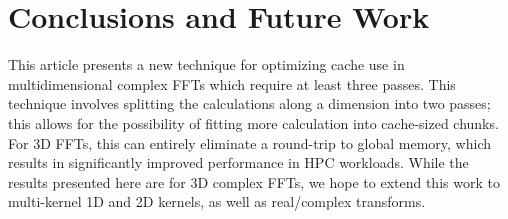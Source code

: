 \documentclass[11pt, onecolumn, journal,compsoc]{IEEEtran}
\theoremstyle{problemstyle}
\begin{document}


\section{Conclusions and Future Work}

This article presents a new technique for optimizing cache use in multidimensional complex FFTs which require at least three passes.  This
technique involves splitting the calculations along a dimension into two passes;
this allows for the possibility of fitting more calculation into
cache-sized chunks.  For 3D FFTs, this can entirely eliminate a
round-trip to global memory, which results in significantly improved performance in HPC workloads.  While the results presented here are for 3D complex FFTs, we hope to extend this work to multi-kernel 1D and 2D kernels, as well as
real/complex transforms.

\begingroup
\let\itshape\upshape


\endgroup

\end{document}
